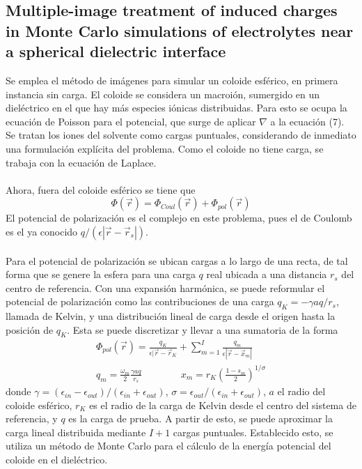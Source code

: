 \documentclass[12pt, notitlepage]{article}
\begin{document}
\subsection{Multiple-image treatment of induced charges in Monte Carlo simulations of electrolytes near a spherical dielectric interface \cite{Gan}}
Se emplea el método de imágenes para simular un coloide esférico, en primera instancia sin carga. El coloide se considera un macroión, sumergido en un dieléctrico en el que hay más especies iónicas distribuidas. Para esto se ocupa la ecuación de Poisson para el potencial, que surge de aplicar $\nabla$ a la ecuación (7). Se tratan los iones del solvente como cargas puntuales, considerando de inmediato una formulación explícita del problema. Como el coloide no tiene carga, se trabaja con la ecuación de Laplace.\\\\
Ahora, fuera del coloide esférico se tiene que
\begin{equation*}
\Phi(\vec{r}) = \Phi_{Coul}(\vec{r}) + \Phi_{pol}(\vec{r})
\end{equation*}
El potencial de polarización es el complejo en este problema, pues el de Coulomb es el ya conocido $q/(\epsilon|\vec{r}-\vec{r}_s|)$.\\\\
Para el potencial de polarización se ubican cargas a lo largo de una recta, de tal forma que se genere la esfera para una carga $q$ real ubicada a una distancia $r_s$ del centro de referencia. Con una expansión harmónica, se puede reformular el potencial de polarización como las contribuciones de una carga $q_K = -\gamma a q/r_s$, llamada de Kelvin, y una distribución lineal de carga desde el origen hasta la posición de $q_K$. Esta se puede discretizar y llevar a una sumatoria de la forma
\begin{gather*}
\Phi_{pol}(\vec{r}) = \frac{q_K}{\epsilon|\vec{r} - \vec{r}_K} + \sum_{m = 1}^I \frac{q_m}{\epsilon|\vec{r} - \vec{x}_m|}\\
q_m = \frac{\omega_m}{2}\frac{\gamma a q}{r_s}\qquad\qquad x_m = r_K\left(\frac{1-s_m}{2}\right)^{1/\sigma}
\end{gather*}
donde $\gamma=(\epsilon_{in} - \epsilon_{out})/(\epsilon_{in}+ \epsilon_{out})$, $\sigma = \epsilon_{out}/(\epsilon_{in} + \epsilon_{out})$, $a$ el radio del coloide esférico, $r_K$ es el radio de la carga de Kelvin desde el centro del sistema de referencia, y $q$ es la carga de prueba. A partir de esto, se puede aproximar la carga lineal distribuida mediante $I + 1$ cargas puntuales. Establecido esto, se utiliza un método de Monte Carlo para el cálculo de la energía potencial del coloide en el dieléctrico.
\end{document}
